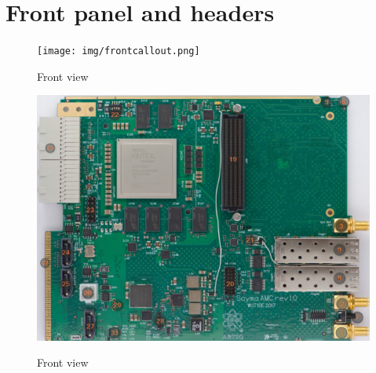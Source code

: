 \section{Front panel and headers}

		\begin{figure}[htbp!]
			\centering
			\texttt{[image: img/frontcallout.png]}\\
			\caption{Front view}
		\end{figure}
		
		\begin{figure}[htbp!]
			\centering
			\includegraphics[width=12cm]{img/topcallout1.png}\\
			\caption{Front view}
		\end{figure}


